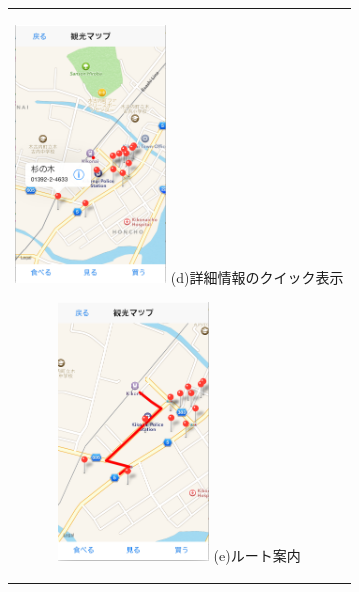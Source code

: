 \addtocounter{figure}{+0}
\begin{figure}[htbp]
  \begin{center}
    \begin{tabular}{c}

      \begin{minipage}{0.33\hsize}
        \begin{center}
\includegraphics[width=4cm, bb=0 0 322 550]{5.3_map1.png}
          \hspace{1cm} (d)詳細情報のクイック表示
        \end{center}
      \end{minipage}

      \begin{minipage}{0.33\hsize}
        \begin{center}
\includegraphics[width=4cm, bb=0 0 321 550]{5.3_map2.png}
          \hspace{1cm} (e)ルート案内
        \end{center}
      \end{minipage}


\end{tabular}
\end{center}
\end{figure}
